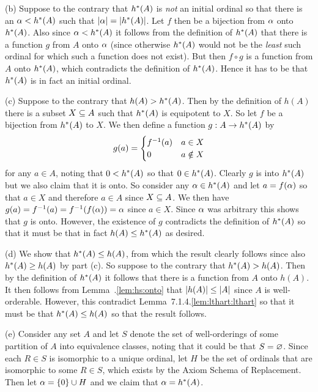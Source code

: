 \begin{solution}
    (b) Suppose to the contrary that $\hs(A)$ is \emph{not} an initial ordinal so that there is an $\a < \hs(A)$ such that $\abs{\a} = \abs{\hs(A)}$.
    Let $f$ then be a bijection from $\a$ onto $\hs(A)$.
    Also since $\a < \hs(A)$ it follows from the definition of $\hs(A)$ that there is a function $g$ from $A$ onto $\a$ (since otherwise $\hs(A)$ would not be the \emph{least} such ordinal for which such a function does not exist).
    But then $f \circ g$ is a function from $A$ onto $\hs(A)$, which contradicts the definition of $\hs(A)$.
    Hence it has to be that $\hs(A)$ is in fact an initial ordinal.

    (c) Suppose to the contrary that $h(A) > \hs(A)$.
    Then by the definition of $h(A)$ there is a subset $X \ss A$ such that $\hs(A)$ is equipotent to $X$.
    So let $f$ be a bijection from $\hs(A)$ to $X$.
    We then define a function $g : A \to \hs(A)$ by
    $$
    g(a) = \begin{cases}
         \inv{f}(a) & a \in X \\
         0 & a \notin X
    \end{cases}
    $$
    for any $a \in A$, noting that $0 < \hs(A)$ so that $0 \in \hs(A)$.
    Clearly $g$ is into $\hs(A)$ but we also claim that it is onto.
    So consider any $\a \in \hs(A)$ and let $a = f(\a)$ so that $a \in X$ and therefore $a \in A$ since $X \ss A$.
    We then have $g(a) = \inv{f}(a) = \inv{f}(f(\a)) = \a$ since $a \in X$.
    Since $\a$ was arbitrary this shows that $g$ is onto.
    However, the existence of $g$ contradicts the definition of $\hs(A)$ so that it must be that in fact $h(A) \leq \hs(A)$ as desired. \qedsymbol

    (d) We show that $\hs(A) \leq h(A)$, from which the result clearly follows since also $\hs(A) \geq h(A)$ by part (c).
    So suppose to the contrary that $\hs(A) > h(A)$.
    Then by the definition of $\hs(A)$ it follows that there is a function from $A$ onto $h(A)$.
    It then  follows from Lemma~\ex.\ref{lem:hs:onto} that $\abs{h(A)} \leq \abs{A}$ since $A$ is well-orderable.
    However, this contradict Lemma~7.1.4.\ref{lem:lthart:lthart} so that it must be that $\hs(A) \leq h(A)$ so that the result follows.

    (e) Consider any set $A$ and let $S$ denote the set of well-orderings of some partition of $A$ into equivalence classes, noting that it could be that $S = \es$.
    Since each $R \in S$ is isomorphic to a unique ordinal, let $H$ be the set of ordinals that are isomorphic to some $R \in S$, which exists by the Axiom Schema of Replacement.
    Then let $\a = \braces{0} \cup H$ and we claim that $\a = \hs(A)$.


\end{solution}
